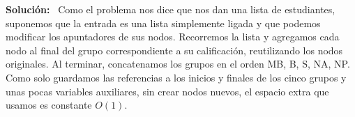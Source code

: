 \documentclass{article}
\newcommand{\Sol}{\textbf{Soluci\'on:} \ }
\begin{document}
\begin{enumerate}
        \medskip
        \Sol Como el problema nos dice que nos dan una lista de estudiantes, suponemos que la entrada es una lista simplemente ligada y que
        podemos modificar los apuntadores de sus nodos. Recorremos la lista y
        agregamos cada nodo al final del grupo correspondiente a su
        calificaci\'on, reutilizando los nodos originales. Al terminar,
        concatenamos los grupos en el orden MB, B, S, NA, NP. Como solo guardamos
        las referencias a los inicios y finales de los cinco grupos y unas pocas
        variables auxiliares, sin crear nodos nuevos, el espacio extra que
        usamos es constante $O(1)$.

        \noindent\begin{minipage}{\linewidth}
        \begin{algorithm}[H]
            \DontPrintSemicolon
            \caption{Ordenamiento por calificaci\'on de letras.}
        \end{algorithm}
        \end{minipage}


\end{enumerate}
\end{document}
